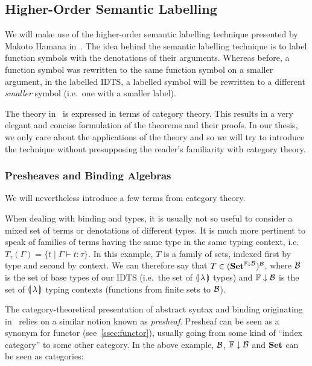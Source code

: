 \subsection{Higher-Order Semantic Labelling}
\label{ssec:semantic-labelling}

We will make use of the higher-order semantic labelling technique presented
by Makoto Hamana in~\cite{hamana2007higher}. The idea behind the semantic
labelling technique is to label function symbols with the denotations of
their arguments. Whereas before, a function symbol was rewritten to the
same function symbol on a smaller argument, in the labelled IDTS, a
labelled symbol will be rewritten to a different \emph{smaller} symbol
(i.e.\ one with a smaller label).

The theory in~\cite{hamana2007higher} is expressed in terms of category
theory. This results in a very elegant and concise formulation of the
theorems and their proofs. In our thesis, we only care about the
applications of the theory and so we will try to introduce the technique
without presupposing the reader's familiarity with category theory.


\subsubsection{Presheaves and Binding Algebras}
\label{sssec:presheaves-binding-algebras}

We will nevertheless introduce a few terms from category theory.

When dealing with binding and types, it is usually not so useful to
consider a mixed set of terms or denotations of different types. It is much
more pertinent to speak of families of terms having the same type in the
same typing context, i.e.\
$T_\tau(\Gamma) = \{ t \mid \Gamma \vdash t : \tau \}$. In this example,
$T$ is a family of sets, indexed first by type and second by context. We
can therefore say that $T \in (\mathbf{Set}^{{\mathbb{F}\downarrow\mathcal{B}}})^{\mathcal{B}}$, where $\mathcal{B}$ is
the set of base types of our IDTS (i.e.\ the set of $\llparenthesis \, \lambda \, \rrparenthesis$
types) and ${\mathbb{F}\downarrow\mathcal{B}}$ is the set of $\llparenthesis \, \lambda \, \rrparenthesis$ typing contexts
(functions from finite sets to $\mathcal{B}$).

The category-theoretical presentation of abstract syntax and binding
originating in~\cite{fiore2003abstract} relies on a similar notion known as
\emph{presheaf}. Presheaf can be seen as a synonym for functor
(see~\ref{ssec:functor}), usually going from some kind of ``index
category'' to some other category. In the above example, $\mathcal{B}$, ${\mathbb{F}\downarrow\mathcal{B}}$
and $\mathbf{Set}$ can be seen as categories:

